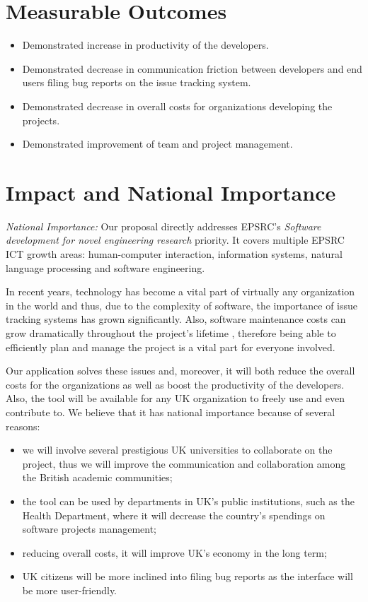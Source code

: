 \documentclass[11pt,english,twocolumn]{article}
\begin{document}
\section{Measurable Outcomes}

\begin{itemize}
	\item Demonstrated increase in productivity of the developers.
	\item Demonstrated decrease in communication friction between developers and end users
	filing bug reports on the issue tracking system.
	\item Demonstrated decrease in overall costs for organizations developing the projects.
	\item Demonstrated improvement of team and project management.
\end{itemize}

\section{Impact and National Importance}

\emph{National Importance:} Our proposal directly addresses EPSRC's \emph{Software development 
for novel engineering research} priority. It covers multiple EPSRC ICT growth areas:
human-computer interaction, information systems, natural language processing and 
software engineering.

In recent years, technology has become a vital part of virtually any organization in the world
and thus, due to the complexity of software, the importance of issue tracking systems has grown 
significantly. Also, software maintenance costs can grow dramatically throughout the project's 
lifetime \cite{kaur2015review}, therefore being able to efficiently plan and manage the project
is a vital part for everyone involved. 

Our application solves these issues and, moreover, 
it will both reduce the overall costs for the organizations as well as boost the productivity
of the developers. Also, the tool will be available for any UK organization to freely use 
and even contribute to. We believe that it has national importance because of several reasons:
	\begin{itemize}
		\item we will involve several prestigious UK universities to collaborate on the project,
		thus we will improve the communication and collaboration among the British academic 
		communities;
		\item the tool can be used by departments in UK's public institutions, such as the 
		Health Department, where it will decrease the country's spendings on software projects
		management;
		\item reducing overall costs, it will improve UK's economy in the long term;
		\item UK citizens will be more inclined into filing bug reports as the interface 
		will be more user-friendly.
	\end{itemize}
\end{document}
